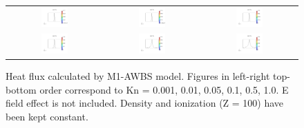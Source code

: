 \documentclass[review]{elsarticle}
\begin{document}
\begin{figure}[tbh]
  \begin{center}
    \begin{tabular}{ccc}
      \includegraphics[width=0.3\textwidth]{figs/hflux_p51DKn1e-3.png} &
	  \includegraphics[width=0.3\textwidth]{figs/hflux_p51DKn1e-2.png} & 
      \includegraphics[width=0.3\textwidth]{figs/hflux_p51DKn5e-2.png} \\
	  \includegraphics[width=0.3\textwidth]{figs/hflux_p51DKn1e-1.png} &
      \includegraphics[width=0.3\textwidth]{figs/hflux_p51DKn5e-1.png} &
	  \includegraphics[width=0.3\textwidth]{figs/hflux_p51DKn1e0.png} 
    \end{tabular}
  \caption{
    Heat flux calculated by M1-AWBS model. Figures in left-right top-bottom 
	order correspond to Kn = 0.001, 0.01, 0.05, 0.1, 0.5, 1.0. 
	E field effect is not included.  
	Density and ionization (Z = 100) have been kept constant.
  }
  \end{center}
  \label{fig:nonlocality_analysis_fluxes}
\end{figure}
\end{document}
